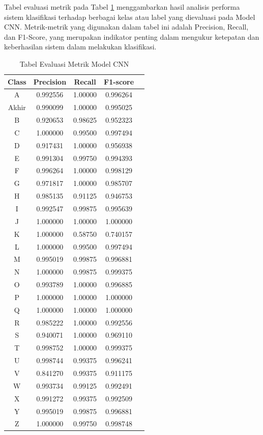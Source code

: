 Tabel evaluasi metrik pada Tabel \ref{tab:tabelevaluasicnn} menggambarkan hasil analisis performa sistem klasifikasi terhadap berbagai kelas atau label yang dievaluasi pada Model CNN. Metrik-metrik yang digunakan dalam tabel ini adalah Precision, Recall, dan F1-Score, yang merupakan indikator penting dalam mengukur ketepatan dan keberhasilan sistem dalam melakukan klasifikasi.
\begin{table}
	\centering
	\caption{Tabel Evaluasi Metrik Model CNN}
	\begin{tabular}{|c|c|c|c|c|}
	\hline
	Class & Precision & Recall & F1-score \\
	\hline
	A     & 0.992556  & 1.00000 & 0.996264 \\
	Akhir & 0.990099  & 1.00000 & 0.995025 \\
	B     & 0.920653  & 0.98625 & 0.952323 \\
	C     & 1.000000  & 0.99500 & 0.997494 \\
	D     & 0.917431  & 1.00000 & 0.956938 \\
	E     & 0.991304  & 0.99750 & 0.994393 \\
	F     & 0.996264  & 1.00000 & 0.998129 \\
	G     & 0.971817  & 1.00000 & 0.985707 \\
	H     & 0.985135  & 0.91125 & 0.946753 \\
	I     & 0.992547  & 0.99875 & 0.995639 \\
	J     & 1.000000  & 1.00000 & 1.000000 \\
	K     & 1.000000  & 0.58750 & 0.740157 \\
	L     & 1.000000  & 0.99500 & 0.997494 \\
	M     & 0.995019  & 0.99875 & 0.996881 \\
	N     & 1.000000  & 0.99875 & 0.999375 \\
	O     & 0.993789  & 1.00000 & 0.996885 \\
	P     & 1.000000  & 1.00000 & 1.000000 \\
	Q     & 1.000000  & 1.00000 & 1.000000 \\
	R     & 0.985222  & 1.00000 & 0.992556 \\
	S     & 0.940071  & 1.00000 & 0.969110 \\
	T     & 0.998752  & 1.00000 & 0.999375 \\
	U     & 0.998744  & 0.99375 & 0.996241 \\
	V     & 0.841270  & 0.99375 & 0.911175 \\
	W     & 0.993734  & 0.99125 & 0.992491 \\
	X     & 0.991272  & 0.99375 & 0.992509 \\
	Y     & 0.995019  & 0.99875 & 0.996881 \\
	Z     & 1.000000  & 0.99750 & 0.998748 \\
	\hline
	\end{tabular}
	\label{tab:tabelevaluasicnn}
	\end{table}
